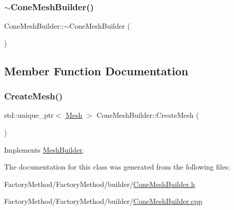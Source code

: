 \mbox{\label{class_cone_mesh_builder_a2f82f490e4331a1489d60a9e50ed20c8}} 
\subsubsection{\texorpdfstring{$\sim$ConeMeshBuilder()}{~ConeMeshBuilder()}}
{\footnotesize\ttfamily Cone\+Mesh\+Builder\+::$\sim$\+Cone\+Mesh\+Builder (\begin{DoxyParamCaption}{ }\end{DoxyParamCaption})}



\subsection{Member Function Documentation}
\mbox{\label{class_cone_mesh_builder_a19a21fdb3432d350817df21315a5f93e}} 
\subsubsection{\texorpdfstring{CreateMesh()}{CreateMesh()}}
{\footnotesize\ttfamily std\+::unique\+\_\+ptr$<$ \mbox{\hyperlink{class_mesh}{Mesh}} $>$ Cone\+Mesh\+Builder\+::\+Create\+Mesh (\begin{DoxyParamCaption}{ }\end{DoxyParamCaption})\hspace{0.3cm}{\ttfamily [virtual]}}



Implements \mbox{\hyperlink{class_mesh_builder_a41cfd23b93c25bc016c889c2c67a2637}{Mesh\+Builder}}.



The documentation for this class was generated from the following files\+:\begin{DoxyCompactItemize}
\item 
Factory\+Method/\+Factory\+Method/builder/\mbox{\hyperlink{_cone_mesh_builder_8h}{Cone\+Mesh\+Builder.\+h}}\item 
Factory\+Method/\+Factory\+Method/builder/\mbox{\hyperlink{_cone_mesh_builder_8cpp}{Cone\+Mesh\+Builder.\+cpp}}\end{DoxyCompactItemize}
